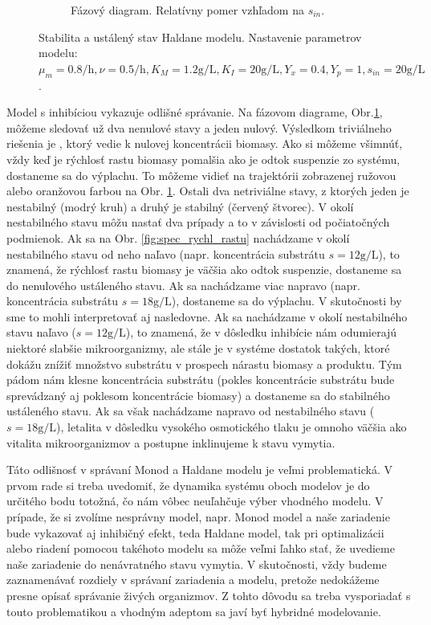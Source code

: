 \begin{figure}
\begin{subfigure}[b]{0.49\textwidth}
		\caption{Fázový diagram. Relatívny pomer vzhľadom na $ s_{in} $.}
		\label{fig:fazovy_haldane}
	\end{subfigure}
	\caption{Stabilita a ustálený stav Haldane modelu. Nastavenie parametrov modelu: $ \mu_{m} = 0.8\si{\per\hour}, \nu = 0.5\si{\per\hour}, K_{M} = 1.2\si{\gram\per\liter}, K_{I} = 20\si{\gram\per\liter}, Y_{x} = 0.4, Y_{p} = 1, s_{in} = 20\si{\gram\per\liter}$.}
	\label{fig:stabilita_haldane}
\end{figure}

Model s inhibíciou vykazuje odlišné správanie. Na fázovom diagrame, Obr.\ref{fig:fazovy_haldane}, môžeme sledovať už dva nenulové stavy a jeden nulový. Výsledkom triviálneho riešenia je , ktorý vedie k nulovej koncentrácii biomasy. Ako si môžeme všimnúť, vždy keď je rýchlosť rastu biomasy pomalšia ako je odtok suspenzie zo systému, dostaneme sa do výplachu. To môžeme vidieť na trajektórii zobrazenej ružovou alebo oranžovou farbou na Obr. \ref{fig:fazovy_haldane}. Ostali dva netriviálne stavy, z ktorých jeden je nestabilný (modrý kruh) a druhý je stabilný (červený štvorec). V okolí nestabilného stavu môžu nastať dva prípady a to v závislosti od počiatočných podmienok. Ak sa na Obr. \ref{fig:spec_rychl_rastu} nachádzame v okolí nestabilného stavu od neho naľavo (napr. koncentrácia substrátu $ s = 12\si{\gram\per\liter} $), to znamená, že rýchlosť rastu biomasy je väčšia ako odtok suspenzie, dostaneme sa do nenulového ustáleného stavu. Ak sa nachádzame viac napravo (napr. koncentrácia substrátu $ s = 18\si{\gram\per\liter} $), dostaneme sa do výplachu. V skutočnosti by sme to mohli interpretovať aj nasledovne. Ak sa nachádzame v okolí nestabilného stavu naľavo ($ s = 12\si{\gram\per\liter} $), to znamená, že v dôsledku inhibície nám odumierajú niektoré slabšie mikroorganizmy, ale stále je v systéme dostatok takých, ktoré dokážu znížiť množstvo substrátu v prospech nárastu biomasy a produktu. Tým pádom nám klesne koncentrácia substrátu (pokles koncentrácie substrátu bude sprevádzaný aj poklesom koncentrácie biomasy) a dostaneme sa do stabilného ustáleného stavu. Ak sa však nachádzame napravo od nestabilného stavu ($ s = 18\si{\gram\per\liter} $), letalita v dôsledku vysokého osmotického tlaku je omnoho väčšia ako vitalita mikroorganizmov a postupne inklinujeme k stavu vymytia.

Táto odlišnosť v správaní Monod a Haldane modelu je veľmi problematická. V prvom rade si treba uvedomiť, že dynamika systému oboch modelov je do určitého bodu totožná, čo nám vôbec neuľahčuje výber vhodného modelu. V prípade, že si zvolíme nesprávny model, napr. Monod model a naše zariadenie bude vykazovať aj inhibičný efekt, teda Haldane model, tak pri optimalizácii alebo riadení pomocou takéhoto modelu sa môže veľmi ľahko stať, že uvedieme naše zariadenie do nenávratného stavu vymytia. V skutočnosti, vždy budeme zaznamenávať rozdiely v správaní zariadenia a modelu, pretože nedokážeme presne opísať správanie živých organizmov. Z tohto dôvodu sa treba vysporiadať s touto problematikou a vhodným adeptom sa javí byť hybridné modelovanie. 